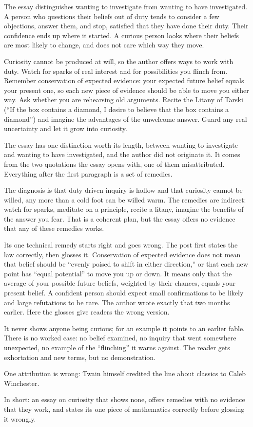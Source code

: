 \begin{afterword}
\summaryhead

The essay distinguishes wanting to investigate from wanting to have investigated. A person who questions their beliefs out of duty tends to consider a few objections, answer them, and stop, satisfied that they have done their duty. Their confidence ends up where it started. A curious person looks where their beliefs are most likely to change, and does not care which way they move.

Curiosity cannot be produced at will, so the author offers ways to work with duty. Watch for sparks of real interest and for possibilities you flinch from. Remember conservation of expected evidence: your expected future belief equals your present one, so each new piece of evidence should be able to move you either way. Ask whether you are rehearsing old arguments. Recite the Litany of Tarski (``If the box contains a diamond, I desire to believe that the box contains a diamond'') and imagine the advantages of the unwelcome answer. Guard any real uncertainty and let it grow into curiosity.

\responsehead

The essay has one distinction worth its length, between wanting to investigate and wanting to have investigated, and the author did not originate it. It comes from the two quotations the essay opens with, one of them misattributed. Everything after the first paragraph is a set of remedies.

The diagnosis is that duty-driven inquiry is hollow and that curiosity cannot be willed, any more than a cold foot can be willed warm. The remedies are indirect: watch for sparks, meditate on a principle, recite a litany, imagine the benefits of the answer you fear. That is a coherent plan, but the essay offers no evidence that any of these remedies works.

Its one technical remedy starts right and goes wrong. The post first states the law correctly, then glosses it. Conservation of expected evidence does not mean that belief should be ``evenly poised to shift in either direction,'' or that each new point has ``equal potential'' to move you up or down. It means only that the average of your possible future beliefs, weighted by their chances, equals your present belief. A confident person should expect small confirmations to be likely and large refutations to be rare. The author wrote exactly that two months earlier. Here the glosses give readers the wrong version.

It never shows anyone being curious; for an example it points to an earlier fable. There is no worked case: no belief examined, no inquiry that went somewhere unexpected, no example of the ``flinching'' it warns against. The reader gets exhortation and new terms, but no demonstration.

One attribution is wrong: Twain himself credited the line about classics to Caleb Winchester.

In short: an essay on curiosity that shows none, offers remedies with no evidence that they work, and states its one piece of mathematics correctly before glossing it wrongly.
\end{afterword}
